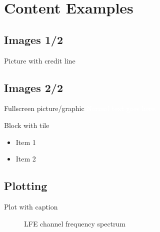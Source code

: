 \documentclass[compress]{beamer}
\begin{document}
\section{Content Examples}

\subsection{Images 1/2}
\begin{frame}{Picture with credit line}
	\begin{figure}
		\centering
	\end{figure}
\end{frame}

\subsection{Images 2/2}
{
\begin{frame}{Fullscreen picture/graphic}
    \textcolor{white}{
    Normal text goes here.
    }
    \begin{block}{Block with tile}
        \begin{itemize}
            \item Item 1
            \item Item 2
        \end{itemize}
    \end{block}
\end{frame}
}


\subsection{Plotting}
\begin{frame}{Plot with caption}
	\begin{figure}
		\centering
		
		\caption{LFE channel frequency spectrum}
	\end{figure}
\end{frame}
\end{document}
